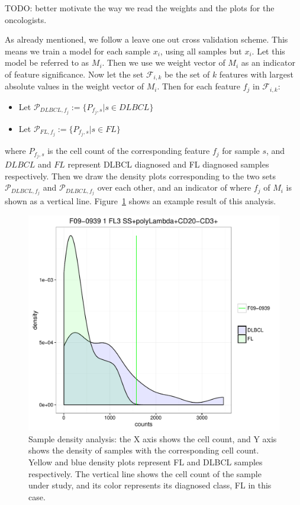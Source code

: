 TODO: better motivate the way we read the weights and the plots for the oncologists.

As already mentioned, we follow a leave one out cross validation scheme. This means we train a model for each sample $x_i$, using all samples but $x_i$. Let this model be referred to as $M_i$. Then we use we weight vector of $M_i$ as an indicator of feature significance. Now let the set $\mathcal{F}_{i,k}$ be the set of $k$ features with largest absolute values in the weight vector of $M_i$. Then for each feature $f_j$ in $\mathcal{F}_{i,k}$:
\begin{itemize}
\item Let $\mathcal{P}_{DLBCL, f_j} := \{P_{f_j, s} | s \in DLBCL\}$
\item Let $\mathcal{P}_{FL, f_j} := \{P_{f_j, s} | s \in FL\}$
\end{itemize}

where $P_{f_j, s}$ is the cell count of the corresponding feature $f_j$ for sample $s$, and $DLBCL$ and $FL$ represent DLBCL diagnosed and FL diagnosed samples respectively. Then we draw the density plots corresponding to the two sets $\mathcal{P}_{DLBCL, f_j}$ and $\mathcal{P}_{DLBCL, f_j}$ over each other, and an indicator of where $f_j$ of $M_i$ is shown as a vertical line. Figure~\ref{fig:fcs-qa-sample-density} shows an example result of this analysis.

\begin{figure}[!ht]
  \centering
  \includegraphics[width=.6\textwidth]{figs/fcs-qa/density-analysis/F09-0939_tube1_0202000120_density}
  \caption{Sample density analysis: the X axis shows the cell count, and Y axis shows the density of samples with the corresponding cell count. Yellow and blue density plots represent FL and DLBCL samples respectively. The vertical line shows the cell count of the sample under study, and its color represents its diagnosed class, FL in this case.}
  \label{fig:fcs-qa-sample-density}
\end{figure}

